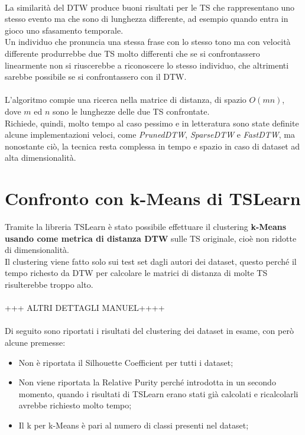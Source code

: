 \\
La similarità del DTW produce buoni risultati per le TS che rappresentano uno stesso evento ma che sono di lunghezza differente, ad esempio quando entra in gioco uno sfasamento temporale.\\
Un individuo che pronuncia una stessa frase con lo stesso tono ma con velocità differente produrrebbe due TS molto differenti che se si confrontassero linearmente non si riuscerebbe a riconoscere lo stesso individuo, che altrimenti sarebbe possibile se si confrontassero con il DTW.\\
\\
L'algoritmo compie una ricerca nella matrice di distanza, di spazio $O(mn)$, dove $m$ ed $n$ sono le lunghezze delle due TS confrontate.\\
Richiede, quindi, molto tempo al caso pessimo e in letteratura sono state definite alcune implementazioni veloci, come \textit{PrunedDTW}, \textit{SparseDTW} e \textit{FastDTW}, ma nonostante ciò, la tecnica resta complessa in tempo e spazio in caso di dataset ad alta dimensionalità.\\

\section{Confronto con k-Means di TSLearn}
Tramite la libreria TSLearn è stato possibile effettuare il clustering \textbf{k-Means usando come metrica di distanza DTW} sulle TS originale, cioè non ridotte di dimensionalità.\\
Il clustering viene fatto solo sui test set dagli autori dei dataset, questo perché il tempo richesto da DTW per calcolare le matrici di distanza di molte TS risulterebbe troppo alto.\\
\\
+++ ALTRI DETTAGLI MANUEL++++\\
\\
Di seguito sono riportati i risultati del clustering dei dataset in esame, con però alcune premesse:
\begin{itemize}
	\item Non è riportata il Silhouette Coefficient per tutti i dataset;
	\item Non viene riportata la Relative Purity perché introdotta in un secondo momento, quando i risultati di TSLearn erano stati già calcolati e ricalcolarli avrebbe richiesto molto tempo;
	\item Il k per k-Means è pari al numero di classi presenti nel dataset;
\end{itemize}

